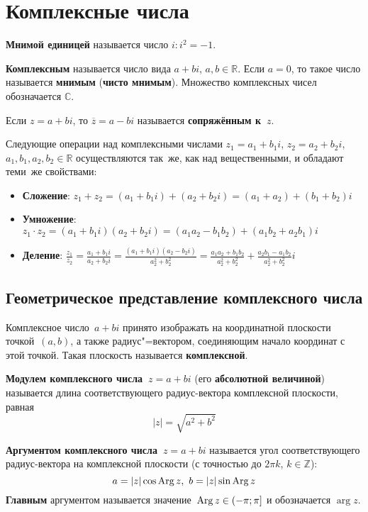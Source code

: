 \section{Комплексные числа}
  \textbf{Мнимой единицей} называется число $i \colon i^2 = -1$.

 \textbf{Комплексным} называется число вида $a + bi$, $a, b \in \mathbb R$.
 Если $a = 0$, то такое число называется \textbf{мнимым} (\textbf{чисто мнимым}).
 Множество комплексных чисел обозначается $\mathbb C$.

Если $z = a + bi$, то $\overline z = a - bi$ называется \textbf{сопряжённым к~$z$}.

Следующие операции над комплексными числами $z_1 = a_1 + b_1 i$, $z_2 = a_2 + b_2 i$, $a_1, b_1, a_2, b_2 \in \mathbb R$ осуществляются так~же, как над вещественными, и обладают теми~же свойствами:
\begin{itemize}
	\item \textbf{Сложение}: $z_1 + z_2 = (a_1 + b_1 i) + (a_2 + b_2 i) = (a_1 + a_2) + (b_1 + b_2)i$
	\item \textbf{Умножение}: $z_1 \cdot z_2 = (a_1 + b_1 i)(a_2 + b_2 i) = (a_1 a_2 - b_1 b_2) + (a_1 b_2 + a_2 b_1)i$
	\item \textbf{Деление}: $\displaystyle \frac{z_1}{z_2} = \frac{a_1 + b_1 i}{a_2 + b_2 i} =
	\frac{(a_1 + b_1 i)(a_2 - b_2 i)}{a_2^2 + b_2^2} =
	\frac{a_1 a_2 + b_1 b_2}{a_2^2 + b_2^2} + \frac{a_2 b_1 - a_1 b_2}{a_2^2 + b_2^2} i$
\end{itemize}

\subsection{Геометрическое представление комплексного числа}
Комплексное число~$a + bi$ принято изображать на координатной плоскости точкой~$(a, b)$, а также радиус"=вектором, соединяющим начало координат с этой точкой.
Такая плоскость называется \textbf{комплексной}.

\textbf{Модулем комплексного числа~$z = a + bi$} (его \textbf{абсолютной величиной}) называется длина соответствующего радиус-вектора комплексной плоскости, равная
\begin{equation*}
|z| = \sqrt{a^2 + b^2}
\end{equation*}

 \textbf{Аргументом комплексного числа~$z = a + bi$} называется угол соответствующего радиус-вектора на комплексной плоскости (с точностью до $2\pi k$, $k \in \mathbb Z$):
\begin{equation*}
a = |z| \cos \operatorname{Arg} z, \ b = |z| \sin \operatorname{Arg} z
\end{equation*}
 \textbf{Главным} аргументом называется значение~$\operatorname{Arg} z \in (-\pi; \pi]$ и обозначается $\arg z$.

